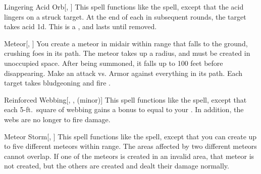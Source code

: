 \lowercase{\hypertarget{spell:Lingering Acid Orb}{}}\label{spell:Lingering Acid Orb}
\begin{freeability}[\nth{3}]{\hypertarget{spell:Lingering Acid Orb}{Lingering Acid Orb}}[, ]
This spell functions like the  spell, except that the acid lingers on a struck target.
At the end of each  in subsequent rounds, the target takes acid  \minus1d.
This is a , and lasts until removed.
\end{freeability}
\vspace{0.25em}



\lowercase{\hypertarget{spell:Meteor}{}}\label{spell:Meteor}
\begin{freeability}[\nth{3}]{\hypertarget{spell:Meteor}{Meteor}}[, ]
You create a meteor in midair within \rngmed range that falls to the ground, crushing foes in its path.
The meteor takes up a \areasmall radius, and must be created in unoccupied space.
After being summoned, it falls up to 100 feet before disappearing.
Make an attack vs. Armor against everything in its path.
\hit Each target takes bludgeoning and fire .
\end{freeability}
\vspace{0.25em}



\lowercase{\hypertarget{spell:Reinforced Webbing}{}}\label{spell:Reinforced Webbing}
\begin{freeability}[\nth{3}]{\hypertarget{spell:Reinforced Webbing}{Reinforced Webbing}}[, ,  (minor)]
This spell functions like the  spell, except that each 5-ft.\ square of webbing gains a bonus to  equal to your .
In addition, the webs are no longer  to fire damage.
\end{freeability}
\vspace{0.25em}



\lowercase{\hypertarget{spell:Meteor Storm}{}}\label{spell:Meteor Storm}
\begin{freeability}[\nth{6}]{\hypertarget{spell:Meteor Storm}{Meteor Storm}}[, ]
This spell functions like the  spell, except that you can create up to five different meteors within \rnglong range.
The areas affected by two different meteors cannot overlap.
If one of the meteors is created in an invalid area, that meteor is not created, but the others are created and dealt their damage normally.
\end{freeability}
\vspace{0.25em}



